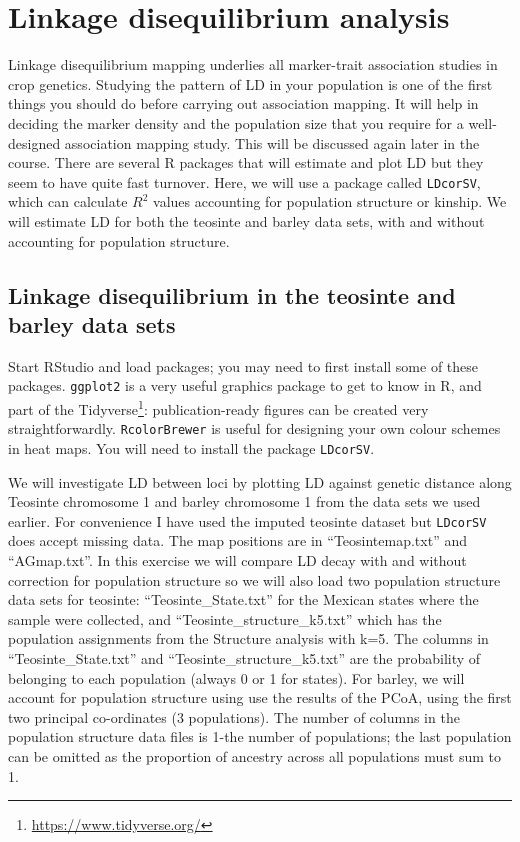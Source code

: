 \documentclass[
]{book}
\renewcommand{\href}[2]{#2\footnote{\url{#1}}}
\begin{document}
\hypertarget{linkage-disequilibrium-analysis}{%
\section{Linkage disequilibrium analysis}\label{linkage-disequilibrium-analysis}}

Linkage disequilibrium mapping underlies all marker-trait association studies in crop genetics. Studying the pattern of LD in your population is one of the first things you should do before carrying out association mapping. It will help in deciding the marker density and the population size that you require for a well-designed association mapping study. This will be discussed again later in the course. There are several R packages that will estimate and plot LD but they seem to have quite fast turnover. Here, we will use a package called \texttt{LDcorSV}, which can calculate \(R^2\) values accounting for population structure or kinship. We will estimate LD for both the teosinte and barley data sets, with and without accounting for population structure.

\hypertarget{linkage-disequilibrium-in-the-teosinte-and-barley-data-sets}{%
\subsection{Linkage disequilibrium in the teosinte and barley data sets}\label{linkage-disequilibrium-in-the-teosinte-and-barley-data-sets}}

Start RStudio and load packages; you may need to first install some of these packages. \texttt{ggplot2} is a very useful graphics package to get to know in R, and part of the \href{https://www.tidyverse.org/}{Tidyverse}: publication-ready figures can be created very straightforwardly. \texttt{RcolorBrewer} is useful for designing your own colour schemes in heat maps. You will need to install the package \texttt{LDcorSV}.

We will investigate LD between loci by plotting LD against genetic distance along Teosinte chromosome 1 and barley chromosome 1 from the data sets we used earlier. For convenience I have used the imputed teosinte dataset but \texttt{LDcorSV} does accept missing data. The map positions are in ``Teosintemap.txt'' and ``AGmap.txt''. In this exercise we will compare LD decay with and without correction for population structure so we will also load two population structure data sets for teosinte: ``Teosinte\_State.txt'' for the Mexican states where the sample were collected, and ``Teosinte\_structure\_k5.txt'' which has the population assignments from the Structure analysis with k=5. The columns in ``Teosinte\_State.txt'' and ``Teosinte\_structure\_k5.txt'' are the probability of belonging to each population (always 0 or 1 for states). For barley, we will account for population structure using use the results of the PCoA, using the first two principal co-ordinates (3 populations). The number of columns in the population structure data files is 1-the number of populations; the last population can be omitted as the proportion of ancestry across all populations must sum to 1.
\end{document}
